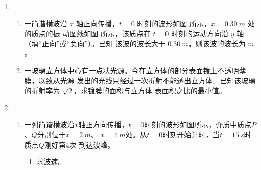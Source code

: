 \begin{enumerate}
\item 
{}
\begin{enumerate}
	\item
一简谐横波沿 $ x $ 轴正向传播，$ t=0 $ 时刻的波形如图  所示，$ x=0.30 \ m $ 处的质点的振
动图线如图  所示，该质点在 $ t=0 $ 时刻的运动方向沿 $ y $ 轴 \underlinegap （填“正向”或“负向”）。已知
该波的波长大于 $ 0.30 \ m $，则该波的波长为 \underlinegap $ m $。
\begin{figure}[h!]
	\centering
\begin{subfigure}{0.4\linewidth}
	\centering
	 
	\caption{}\label{2012新课标3401a}
\end{subfigure}
\begin{subfigure}{0.4\linewidth}
	\centering
	 
	\caption{}\label{2012新课标3401b}
\end{subfigure}
\end{figure}




\item 
一玻璃立方体中心有一点状光源。今在立方体的部分表面镀上不透明薄膜，以致从光源
发出的光线只经过一次折射不能透出立方体。已知该玻璃的折射率为 $ \sqrt{2} $，求镀膜的面积与立方体
表面积之比的最小值。




\end{enumerate}


\item 
{}
\begin{enumerate}
	\item
一列简谐横波沿$ x $轴正方向传播，$ t=0 $时刻的波形如图所示，介质中质点$ P $、$ Q $分别位于$ x=2 \ m $、
$ x=4 \ m $处。从$ t=0 $时刻开始计时，当$ t=15 \ s $时质点$ Q $刚好第$ 4 $次
到达波峰。
\begin{enumerate}
	\item
求波速。


\end{enumerate}
\end{enumerate}
\end{enumerate}
